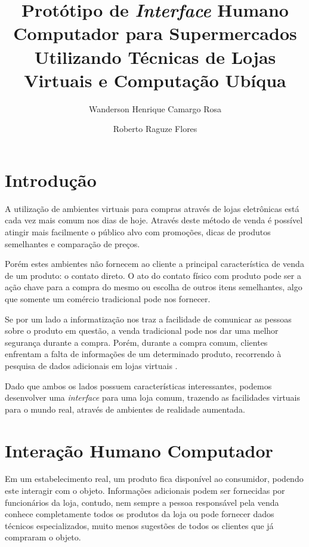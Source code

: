 \documentclass{article}
\title{Protótipo de \emph{Interface} Humano Computador para Supermercados
Utilizando Técnicas de Lojas Virtuais e Computação Ubíqua}
\author{Wanderson Henrique Camargo Rosa\inst{1} \and Roberto Raguze
Flores\inst{1}}
\begin{document}
\maketitle{}

\section{Introdução}


A utilização de ambientes virtuais para compras através de lojas eletrônicas
está cada vez mais comum nos dias de hoje. Através deste método de venda é
possível atingir mais facilmente o público alvo com promoções, dicas de produtos
semelhantes e comparação de preços.


Porém estes ambientes não fornecem ao cliente a principal característica de
venda de um produto: o contato direto. O ato do contato físico com produto pode
ser a ação chave para a compra do mesmo ou escolha de outros itens semelhantes,
algo que somente um comércio tradicional pode nos fornecer.

Se por um lado a informatização nos traz a facilidade de comunicar as pessoas
sobre o produto em questão, a venda tradicional pode nos dar uma melhor
segurança durante a compra. Porém, durante a compra comum, clientes enfrentam a
falta de informações de um determinado produto, recorrendo à pesquisa de dados
adicionais em lojas virtuais \cite{vonreischach2009}.


Dado que ambos os lados possuem características interessantes, podemos
desenvolver uma \emph{interface} para uma loja comum, trazendo as facilidades
virtuais para o mundo real, através de ambientes de realidade aumentada.

\section{Interação Humano Computador}


Em um estabelecimento real, um produto fica disponível ao consumidor, podendo
este interagir com o objeto. Informações adicionais podem ser fornecidas por
funcionários da loja, contudo, nem sempre a pessoa responsável pela venda
conhece completamente todos os produtos da loja ou pode fornecer dados técnicos
especializados, muito menos sugestões de todos os clientes que já compraram o
objeto.
\end{document}
